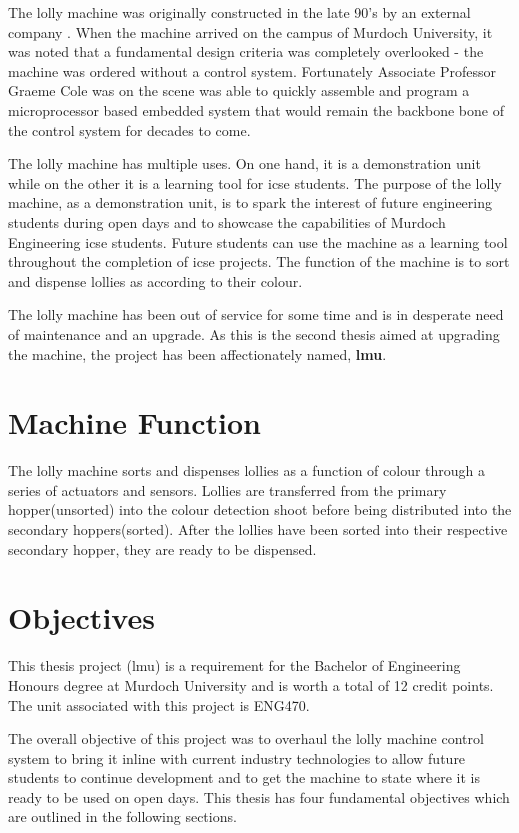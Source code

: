 The lolly machine was originally constructed in the late 90's by an external company \cite{computerControlGCole}. When the machine arrived on the campus of Murdoch University, it was noted that a fundamental design criteria was completely overlooked - the machine was ordered without a control system. Fortunately Associate Professor Graeme Cole was on the scene was able to quickly assemble and program a microprocessor based embedded system that would remain the backbone bone of the control system for decades to come. 

The lolly machine has multiple uses. On one hand, it is a demonstration unit while on the other it is a learning tool for \acrshort{icse} students. The purpose of the lolly machine, as a demonstration unit, is to spark the interest of future engineering students during open days and to showcase the capabilities of Murdoch Engineering \acrlong{icse} students. Future students can use the machine as a learning tool throughout the completion of \acrshort{icse} projects. 
The function of the machine is to sort and dispense lollies as according to their colour.

The lolly machine has been out of service for some time and is in desperate need of maintenance and an upgrade. As this is the second thesis aimed at upgrading the machine, the project has been affectionately named, \textbf{\acrfull{lmu}}.

\section{Machine Function}
    The lolly machine sorts and dispenses lollies as a function of colour through a series of actuators and sensors. Lollies are transferred from the primary hopper(unsorted) into the colour detection shoot before being distributed into the secondary hoppers(sorted). After the lollies have been sorted into their respective secondary hopper, they are ready to be dispensed.

\section{Objectives}
   This thesis project (\acrfull{lmu}) is a requirement for the Bachelor of Engineering Honours degree at Murdoch University and is worth a total of 12 credit points. The unit associated with this project is ENG470. 
   
   The overall objective of this project was to overhaul the lolly machine control system to bring it inline with current industry technologies to allow future students to continue development and to get the machine to state where it is ready to be used on open days. This thesis  has four fundamental objectives which are outlined in the following sections.
   
